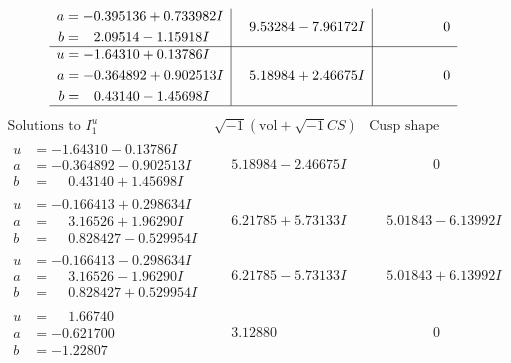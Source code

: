 \documentclass[1p]{elsarticle_modified}
\theoremstyle{definition}
\newcommand{\I}{\sqrt{-1}}
\begin{document}
$$\begin{array}{c|c|c}
\begin{aligned}
a &= -0.395136 + 0.733982 I \\
b &= \phantom{-}2.09514 - 1.15918 I\end{aligned}
 & \phantom{-}9.53284 - 7.96172 I & \phantom{-0.000000 } 0 \\ \hline\begin{aligned}
u &= -1.64310 + 0.13786 I \\
a &= -0.364892 + 0.902513 I \\
b &= \phantom{-}0.43140 - 1.45698 I\end{aligned}
 & \phantom{-}5.18984 + 2.46675 I & \phantom{-0.000000 } 0\\
 \hline 
 \end{array}$$\newpage$$\begin{array}{c|c|c}  
\text{Solutions to }I^u_{1}& \I (\text{vol} + \sqrt{-1}CS) & \text{Cusp shape}\\
 \hline 
\begin{aligned}
u &= -1.64310 - 0.13786 I \\
a &= -0.364892 - 0.902513 I \\
b &= \phantom{-}0.43140 + 1.45698 I\end{aligned}
 & \phantom{-}5.18984 - 2.46675 I & \phantom{-0.000000 } 0 \\ \hline\begin{aligned}
u &= -0.166413 + 0.298634 I \\
a &= \phantom{-}3.16526 + 1.96290 I \\
b &= \phantom{-}0.828427 - 0.529954 I\end{aligned}
 & \phantom{-}6.21785 + 5.73133 I & \phantom{-}5.01843 - 6.13992 I \\ \hline\begin{aligned}
u &= -0.166413 - 0.298634 I \\
a &= \phantom{-}3.16526 - 1.96290 I \\
b &= \phantom{-}0.828427 + 0.529954 I\end{aligned}
 & \phantom{-}6.21785 - 5.73133 I & \phantom{-}5.01843 + 6.13992 I \\ \hline\begin{aligned}
u &= \phantom{-}1.66740\phantom{ +0.000000I} \\
a &= -0.621700\phantom{ +0.000000I} \\
b &= -1.22807\phantom{ +0.000000I}\end{aligned}
 & \phantom{-}3.12880\phantom{ +0.000000I} & \phantom{-0.000000 } 0 \\ \hline\begin{aligned}

\end{aligned}
\end{array}$$
\end{document}
